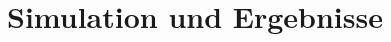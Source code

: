 \documentclass{article}
\begin{document}
  \section{Simulation und Ergebnisse} %
  \label{sec:simulation_und_ergebnisse}



\end{document}
